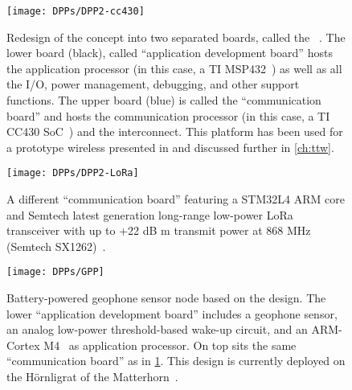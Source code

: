\begin{subappendices}
\begin{figure}[!b]
	\centering
	\texttt{[image: DPPs/DPP2-cc430]}
	\caption{Redesign of the \DPP concept into two separated boards, called the \DPPtwo~\cite{beutel2019DPPdemo}. The lower board (black), called ``application development board'' hosts the application processor (in this case, a TI MSP432~\cite{msp432}) as well as all the I/O, power management, debugging, and other support functions. The upper board (blue) is called the ``communication board'' and hosts the communication processor (in this case, a TI CC430 SoC~\cite{CC430F6137}) and the \bolt interconnect.
	This platform has been used for a prototype wireless \CPS presented in \cite{mager2019Feedback, mager2019Demo} and discussed further in \cref{ch:ttw}.}
	\label{fig:dpp2-cc430}
\end{figure}

\begin{figure}
	\centering
	\texttt{[image: DPPs/DPP2-LoRa]}
	\caption{A different \DPPtwo ``communication board'' featuring a STM32L4 ARM core and Semtech latest generation long-range low-power LoRa transceiver with up to +22 dB m transmit power at 868 MHz (Semtech SX1262)~\cite{semtechSX1262}.}
	\label{fig:dpp2-lora}
\end{figure}

\begin{figure}
	\centering
	\texttt{[image: DPPs/GPP]}
	\caption{Battery-powered geophone sensor node based on the \DPPtwo design.
	The lower ``application development board'' includes a geophone sensor, an analog low-power threshold-based wake-up circuit, and an ARM-Cortex M4~\cite{armCortexM4} as application processor.
	On top sits the same ``communication board'' as in \cref{fig:dpp2-cc430}.
	This design is currently deployed on the Hörnligrat of the Matterhorn~\cite{meyer2019IPSN}.}
	\label{fig:GPP}
\end{figure}

\end{subappendices}
